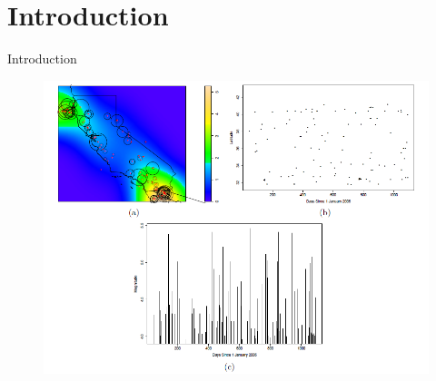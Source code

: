 \documentclass[11pt]{beamer}
\theoremstyle{example}
\begin{document}
\section{Introduction}
\begin{frame}{Introduction}
	\begin{figure}[H]
		\centering
		\includegraphics[scale=.5]{introduction}
	\end{figure}
\end{frame}
\end{document}
